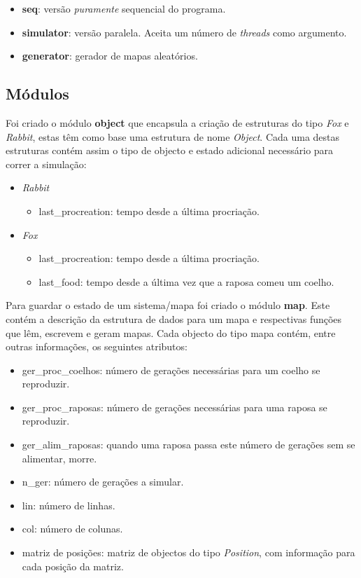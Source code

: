 \documentclass[12pt]{article}
\begin{document}
\begin{itemize}
  \item \textbf{seq}: versão \textit{puramente} sequencial do programa.
  \item \textbf{simulator}: versão paralela. Aceita um número de \textit{threads} como argumento.
  \item \textbf{generator}: gerador de mapas aleatórios.
\end{itemize}

\subsection{Módulos}

Foi criado o módulo \textbf{object} que encapsula a criação de estruturas do
tipo \textit{Fox} e \textit{Rabbit}, estas têm como base uma estrutura de nome \textit{Object}.
Cada uma destas estruturas contém assim o tipo de objecto e estado adicional necessário para correr a simulação:

\begin{itemize}
  \item \textit{Rabbit}
  \begin{itemize}
    \item last\_procreation: tempo desde a última procriação.
  \end{itemize}
  \item \textit{Fox}
  \begin{itemize}
    \item last\_procreation: tempo desde a última procriação.
    \item last\_food: tempo desde a última vez que a raposa comeu um coelho.
  \end{itemize}
\end{itemize}

Para guardar o estado de um sistema/mapa foi criado o módulo \textbf{map}. Este
contém a descrição da estrutura de dados para um mapa e respectivas funções que lêm,
escrevem e geram mapas. Cada objecto do tipo mapa contém, entre outras informações,
os seguintes atributos:

\begin{itemize}
  \item ger\_proc\_coelhos: número de gerações necessárias para um coelho se reproduzir.
  \item ger\_proc\_raposas: número de gerações necessárias para uma raposa se reproduzir.
  \item ger\_alim\_raposas: quando uma raposa passa este número de gerações sem se alimentar, morre.
  \item n\_ger: número de gerações a simular.
  \item lin: número de linhas.
  \item col: número de colunas.
  \item matriz de posições: matriz de objectos do tipo \textit{Position}, com informação para cada posição da matriz.
\end{itemize}
\end{document}
